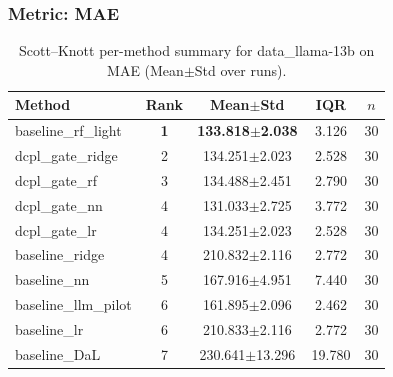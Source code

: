 \subsubsection*{Metric: MAE}
\begin{table}[H]
\centering
\scriptsize
\setlength{\tabcolsep}{4pt}
\renewcommand{\arraystretch}{1.1}
\caption{Scott--Knott per-method summary for data\_llama-13b on MAE (Mean$\pm$Std over runs).}
\label{tab:sk_data_llama-13b_MAE}
\begin{tabular}{l|c|c|c|c}
\hline
\textbf{Method} & \textbf{Rank} & \textbf{Mean$\pm$Std} & \textbf{IQR} & \textbf{$n$} \\
\hline
\rowcolor{red!15} baseline\_rf\_light & \textbf{1} & \textbf{133.818$\pm$2.038} & 3.126 & 30 \\
dcpl\_gate\_ridge & 2 & 134.251$\pm$2.023 & 2.528 & 30 \\
dcpl\_gate\_rf & 3 & 134.488$\pm$2.451 & 2.790 & 30 \\
dcpl\_gate\_nn & 4 & 131.033$\pm$2.725 & 3.772 & 30 \\
dcpl\_gate\_lr & 4 & 134.251$\pm$2.023 & 2.528 & 30 \\
baseline\_ridge & 4 & 210.832$\pm$2.116 & 2.772 & 30 \\
baseline\_nn & 5 & 167.916$\pm$4.951 & 7.440 & 30 \\
baseline\_llm\_pilot & 6 & 161.895$\pm$2.096 & 2.462 & 30 \\
baseline\_lr & 6 & 210.833$\pm$2.116 & 2.772 & 30 \\
baseline\_DaL & 7 & 230.641$\pm$13.296 & 19.780 & 30 \\
\hline
\end{tabular}
\end{table}


